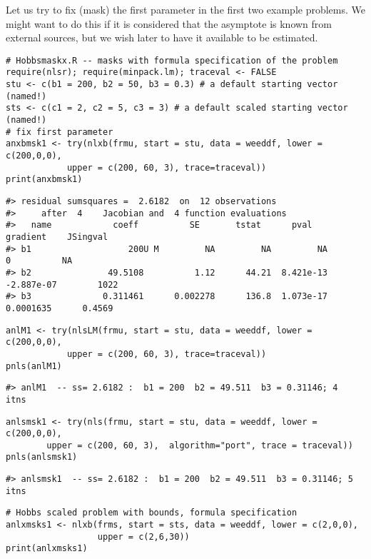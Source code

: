 Let us try to fix (mask) the first parameter in the first two example problems. We might
want to do this if it is considered that the asymptote is known from external sources,
but we wish later to have it available to be estimated.

\begin{verbatim}
# Hobbsmaskx.R -- masks with formula specification of the problem
require(nlsr); require(minpack.lm); traceval <- FALSE
stu <- c(b1 = 200, b2 = 50, b3 = 0.3) # a default starting vector (named!)
sts <- c(c1 = 2, c2 = 5, c3 = 3) # a default scaled starting vector (named!)
# fix first parameter
anxbmsk1 <- try(nlxb(frmu, start = stu, data = weeddf, lower = c(200,0,0), 
            upper = c(200, 60, 3), trace=traceval))
print(anxbmsk1)
\end{verbatim}

\begin{verbatim}
#> residual sumsquares =  2.6182  on  12 observations
#>     after  4    Jacobian and  4 function evaluations
#>   name            coeff          SE       tstat      pval      gradient    JSingval   
#> b1                   200U M         NA         NA         NA           0          NA  
#> b2               49.5108          1.12      44.21  8.421e-13  -2.887e-07        1022  
#> b3              0.311461      0.002278      136.8  1.073e-17   0.0001635      0.4569
\end{verbatim}

\begin{verbatim}
anlM1 <- try(nlsLM(frmu, start = stu, data = weeddf, lower = c(200,0,0), 
            upper = c(200, 60, 3), trace=traceval))
pnls(anlM1)
\end{verbatim}

\begin{verbatim}
#> anlM1  -- ss= 2.6182 :  b1 = 200  b2 = 49.511  b3 = 0.31146; 4  itns
\end{verbatim}

\begin{verbatim}
anlsmsk1 <- try(nls(frmu, start = stu, data = weeddf, lower = c(200,0,0), 
        upper = c(200, 60, 3),  algorithm="port", trace = traceval))
pnls(anlsmsk1)
\end{verbatim}

\begin{verbatim}
#> anlsmsk1  -- ss= 2.6182 :  b1 = 200  b2 = 49.511  b3 = 0.31146; 5  itns
\end{verbatim}

\begin{verbatim}
# Hobbs scaled problem with bounds, formula specification
anlxmsks1 <- nlxb(frms, start = sts, data = weeddf, lower = c(2,0,0),
                  upper = c(2,6,30))
print(anlxmsks1)
\end{verbatim}

